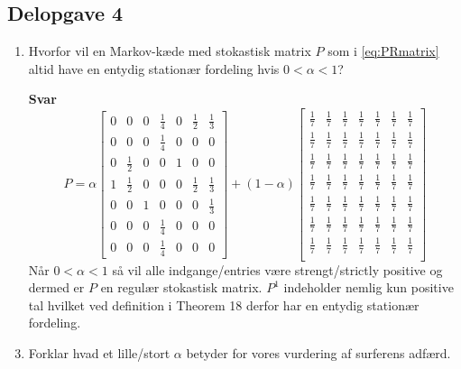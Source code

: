 \documentclass[10pt,a4paper]{article}
\begin{document}
\subsection*{Delopgave 4}
\begin{enumerate}
	\item Hvorfor vil en Markov-kæde med stokastisk matrix $P$ som i \eqref{eq:PRmatrix} altid have en entydig stationær fordeling hvis $0<\alpha<1$?
	\item[\textbf{Svar}] \[
	P=\alpha \begin{bmatrix}
			0 & 0 & 0 & \frac{1}{4} & 0 & \frac{1}{2} & \frac{1}{3} \\
			0 & 0 &0 & \frac{1}{4} & 0 & 0 & 0 \\
			0 & \frac{1}{2} & 0 &0 & 1 & 0 & 0 \\
			1 & \frac{1}{2} & 0 &0 & 0 & \frac{1}{2} & \frac{1}{3} \\
			0 & 0 & 1 & 0 & 0 & 0 & \frac{1}{3} \\
			0 & 0 & 0 & \frac{1}{4} & 0 & 0 &0 \\
			0 & 0 & 0 & \frac{1}{4} & 0 & 0 &0
		\end{bmatrix}+(1-\alpha)\begin{bmatrix}
		\frac{1}{7} & \frac{1}{7} & \frac{1}{7} & \frac{1}{7} & \frac{1}{7} & \frac{1}{7} & \frac{1}{7} \\
		\frac{1}{7} & \frac{1}{7} & \frac{1}{7} & \frac{1}{7} & \frac{1}{7} & \frac{1}{7} & \frac{1}{7} \\
		\frac{1}{7} & \frac{1}{7} & \frac{1}{7} & \frac{1}{7} & \frac{1}{7} & \frac{1}{7} & \frac{1}{7} \\
		\frac{1}{7} & \frac{1}{7} & \frac{1}{7} & \frac{1}{7} & \frac{1}{7} & \frac{1}{7} & \frac{1}{7} \\
		\frac{1}{7} & \frac{1}{7} & \frac{1}{7} & \frac{1}{7} & \frac{1}{7} & \frac{1}{7} & \frac{1}{7} \\
		\frac{1}{7} & \frac{1}{7} & \frac{1}{7} & \frac{1}{7} & \frac{1}{7} & \frac{1}{7} & \frac{1}{7} \\
		\frac{1}{7} & \frac{1}{7} & \frac{1}{7} & \frac{1}{7} & \frac{1}{7} & \frac{1}{7} & \frac{1}{7} \\
	\end{bmatrix}
	\]
	Når $0<\alpha<1$ så vil alle indgange/entries være strengt/strictly positive og dermed er $P$ en regulær stokastisk matrix. $P^1$ indeholder nemlig kun positive tal hvilket ved definition i Theorem 18 derfor har en entydig stationær fordeling.
	\item Forklar hvad et lille/stort $\alpha$ betyder for vores vurdering af surferens adfærd.

\end{enumerate}
\end{document}
